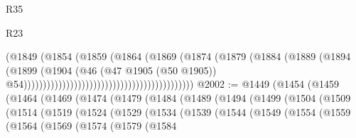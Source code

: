 \begin{lexlean}{R35}
\begin{lexlean}{R23}
\begin{coremodule}
{{{{{{{{{{{{{{{{{{{{{                                                                  (@1849
                                                                    (@1854
                                                                      (@1859
                                                                        (@1864
                                                                          (@1869
                                                                            (@1874
                                                                              (@1879
                                                                                (@1884
                                                                                  (@1889
                                                                                    (@1894
                                                                                      (@1899
                                                                                        (@1904
                                                                                          (@46
                                                                                            (@47
                                                                                              @1905
                                                                                              (@50
                                                                                                @1905))
                                                                                            @54))))))))))))))))))))))))))))))))))))))))))))
@2002 := @1449
    (@1454
      (@1459
        (@1464
          (@1469
            (@1474
              (@1479
                (@1484
                  (@1489
                    (@1494
                      (@1499
                        (@1504
                          (@1509
                            (@1514
                              (@1519
                                (@1524
                                  (@1529
                                    (@1534
                                      (@1539
                                        (@1544
                                          (@1549
                                            (@1554
                                              (@1559
                                                (@1564
                                                  (@1569
                                                    (@1574
                                                      (@1579
                                                        (@1584
}}}}}}}}}}}}}}}}}}}}}
\end{coremodule}
\end{lexlean}
\end{lexlean}
